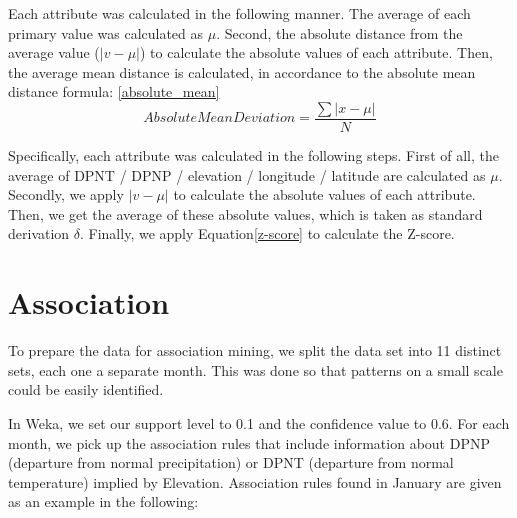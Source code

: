 \documentclass[11pt]{article}
\begin{document}
Each attribute was calculated in the following manner. The average of each primary value was calculated as $\mu$. Second, the absolute distance from the average value ($|v-\mu|$) to calculate the absolute values of each attribute. Then, the average mean distance is calculated, in accordance to the absolute mean distance formula:
\eqref{absolute_mean}
\begin{equation}
Absolute Mean Deviation = \frac{\sum{|x - \mu|}}{N}
\label{absolute_mean}
\end{equation}

Specifically, each attribute was calculated in the following steps. First of all, the average of DPNT / DPNP / elevation / longitude / latitude are calculated as $\mu$. Secondly, we apply $|v-\mu|$ to calculate the absolute values of each attribute. Then, we get the average of these absolute values, which is taken as standard derivation $\delta$. Finally, we apply Equation\eqref{z-score} to calculate the Z-score.

\section{Association}

To prepare the data for association mining, we split the data set into 11 distinct sets, each one a separate month. This was done so that patterns on a small scale could be easily identified.

In Weka, we set our support level to 0.1 and the confidence value to 0.6. For each month, we pick up the association rules that include information about DPNP (departure from normal precipitation) or DPNT (departure from normal temperature) implied by Elevation.  Association rules found in January are given as an example in the following:
\end{document}
